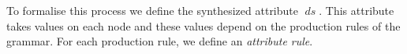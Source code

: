 To formalise this process %
we define the synthesized attribute $\operatorname{\textit{ds}}$. %
This attribute takes values on each node and these values depend on the production rules of the grammar. 
For each production rule, we define an \emph{attribute rule}.
%
